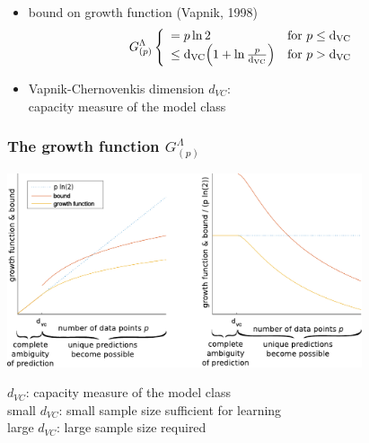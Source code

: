 \begin{frame}
	\begin{itemize}
		\item bound on growth function (Vapnik, 1998)
			\begin{equation}
				G_{(p)}^\Lambda
				\left \{ \begin{array}{ll}
					= p \ln 2 
					& \text{for } p \leq \mathrm{d}_{\mathrm{VC}} \\
					\leq \mathrm{d}_{\mathrm{VC}} \Big( 1 + \ln \frac{p}{\mathrm{d}_{\mathrm{VC}}} \Big) 
					& \text{for } p > \mathrm{d}_{\mathrm{VC}}
				\end{array} \right.
			\label{eq:growthpiecewise}
			\end{equation}

		\item Vapnik-Chernovenkis dimension $d_{VC}$: \\
			capacity measure of the model class
	\end{itemize}
\end{frame}

\begin{frame}\frametitle{The growth function $G_{(p)}^\Lambda$}
	\begin{center}
		\includegraphics[height=5.7cm]{img/growth_function_clean}
	\end{center}
	\vspace{-2mm}
	$d_{VC}$: capacity measure of the model class\\
	small $d_{VC}$: small sample size sufficient for learning\\
	large $d_{VC}$: large sample size required

\end{frame}



